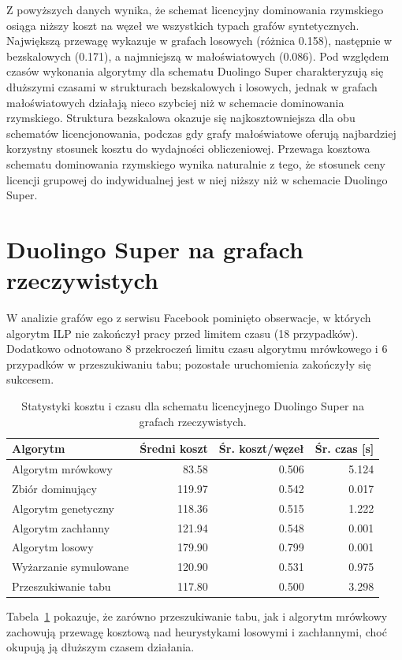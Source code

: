 Z powyższych danych wynika, że schemat licencyjny dominowania rzymskiego osiąga niższy koszt na węzeł we wszystkich typach grafów syntetycznych. Największą przewagę wykazuje w grafach losowych (różnica 0.158), następnie w bezskalowych (0.171), a najmniejszą w małoświatowych (0.086). Pod względem czasów wykonania algorytmy dla schematu Duolingo Super charakteryzują się dłuższymi czasami w strukturach bezskalowych i losowych, jednak w grafach małoświatowych działają nieco szybciej niż w schemacie dominowania rzymskiego. Struktura bezskalowa okazuje się najkosztowniejsza dla obu schematów licencjonowania, podczas gdy grafy małoświatowe oferują najbardziej korzystny stosunek kosztu do wydajności obliczeniowej. Przewaga kosztowa schematu dominowania rzymskiego wynika naturalnie z tego, że stosunek ceny licencji grupowej do indywidualnej jest w niej niższy niż w schemacie Duolingo Super.


\section{Duolingo Super na grafach rzeczywistych}
W analizie grafów ego z serwisu Facebook pominięto obserwacje, w których algorytm ILP nie zakończył pracy przed limitem czasu (18 przypadków). Dodatkowo odnotowano 8 przekroczeń limitu czasu algorytmu mrówkowego i 6 przypadków w przeszukiwaniu tabu; pozostałe uruchomienia zakończyły się sukcesem.

\begin{table}[H]
  \centering
  \caption{Statystyki kosztu i czasu dla schematu licencyjnego Duolingo Super na grafach rzeczywistych.}
  \label{tab:duo-real-alg}
  \begin{tabular}{lrrr}
    \toprule
    \textbf{Algorytm}     & \textbf{Średni koszt} & \textbf{Śr. koszt/węzeł} & \textbf{Śr. czas [s]} \\
    \midrule
    Algorytm mrówkowy     & 83.58                 & 0.506                    & 5.124                 \\
    Zbiór dominujący      & 119.97                & 0.542                    & 0.017                 \\
    Algorytm genetyczny   & 118.36                & 0.515                    & 1.222                 \\
    Algorytm zachłanny    & 121.94                & 0.548                    & 0.001                 \\
    Algorytm losowy       & 179.90                & 0.799                    & 0.001                 \\
    Wyżarzanie symulowane & 120.90                & 0.531                    & 0.975                 \\
    Przeszukiwanie tabu   & 117.80                & 0.500                    & 3.298                 \\
    \bottomrule
  \end{tabular}
\end{table}
Tabela~\ref{tab:duo-real-alg} pokazuje, że zarówno przeszukiwanie tabu, jak i algorytm mrówkowy zachowują przewagę kosztową nad heurystykami losowymi i zachłannymi, choć okupują ją dłuższym czasem działania.

